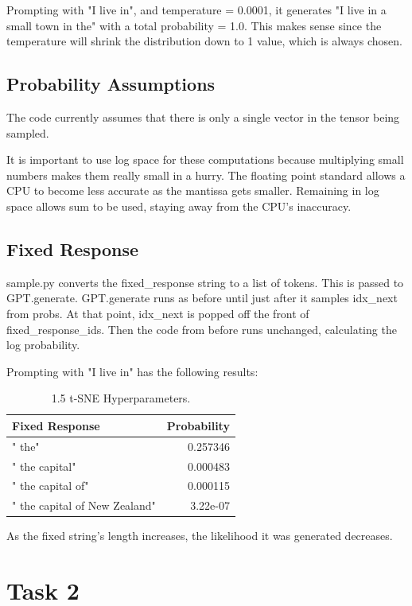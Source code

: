\documentclass[11pt]{article}
\begin{document}
Prompting with "I live in", and temperature = 0.0001, it generates "I live in a small town in the" with a total probability = 1.0. This makes sense since the temperature will shrink the distribution down to 1 value, which is always chosen.

\subsection{Probability Assumptions}

The code currently assumes that there is only a single vector in the tensor being sampled. 

It is important to use log space for these computations because multiplying small numbers makes them really small in a hurry. The floating point standard allows a CPU to become less accurate as the mantissa gets smaller. Remaining in log space allows sum to be used, staying away from the CPU's inaccuracy.

\subsection{Fixed Response}

sample.py converts the fixed\_response string to a list of tokens. This is passed to GPT.generate. GPT.generate runs as before until just after it samples idx\_next from probs. At that point, idx\_next is popped off the front of fixed\_response\_ids. Then the code from before runs unchanged, calculating the log probability.

Prompting with "I live in" has the following results:

\begin{table}[H]
	\centering
	\begin{tabular}{ | l | r | }
		\hline
		\textbf{Fixed Response} & \textbf{Probability} \\
		\hline
		" the" & 0.257346 \\
		\hline
		" the capital" & 0.000483 \\
		\hline
		" the capital of" & 0.000115 \\
		\hline
		" the capital of New Zealand" & 3.22e-07 \\
		\hline
	\end{tabular}
	\caption{1.5 t-SNE Hyperparameters.}
\end{table}

As the fixed string's length increases, the likelihood it was generated decreases.

\section{Task 2}
\end{document}
